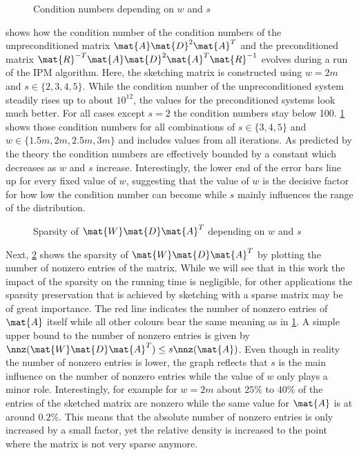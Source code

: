 \begin{figure}[tbp]%
  \centering%
  \caption{Condition numbers depending on \(w\) and \(s\)}%
  \label{fig:condition_number}
\end{figure}%

 shows how the condition number of the condition numbers of the unpreconditioned matrix \(\mat{A}\mat{D}^2\mat{A}^T\) and the preconditioned matrix \(\mat{R}^{-T}\mat{A}\mat{D}^2\mat{A}^T\mat{R}^{-1}\) evolves during a run of the IPM algorithm.
Here, the sketching matrix is constructed using \(w=2m\) and \(s \in \{2, 3, 4, 5\}\).
While the condition number of the unpreconditioned system steadily rises up to about \(10^{12}\), the values for the preconditioned systems look much better.
For all cases except \(s = 2\) the condition numbers stay below 100.
\cref{fig:condition_number} shows those condition numbers for all combinations of \(s \in \{3,4,5\}\) and \(w \in \{1.5m, 2m, 2.5m, 3m\}\) and includes values from all iterations.
As predicted by the theory the condition numbers are effectively bounded by a constant which decreases as \(w\) and \(s\) increase.
Interestingly, the lower end of the error bars line up for every fixed value of \(w\), suggesting that the value of \(w\) is the decisive factor for how low the condition number can become while \(s\) mainly influences the range of the distribution.

\begin{figure}[tbp]%
  \centering%
  \caption{Sparsity of \(\mat{W}\mat{D}\mat{A}^T\) depending on \(w\) and \(s\)}%
  \label{fig:sparsity}
\end{figure}%

Next, \cref{fig:sparsity} shows the sparsity of \(\mat{W}\mat{D}\mat{A}^T\) by plotting the number of nonzero entries of the matrix.
While we will see that in this work the impact of the sparsity on the running time is negligible, for other applications the sparsity preservation that is achieved by sketching with a sparse matrix may be of great importance.
The red line indicates the number of nonzero entries of \(\mat{A}\) itself while all other colours bear the same meaning as in \cref{fig:condition_number}.
A simple upper bound to the number of nonzero entries is given by \(\nnz(\mat{W}\mat{D}\mat{A}^T) \leq s \nnz(\mat{A})\).
Even though in reality the number of nonzero entries is lower, the graph reflects that \(s\) is the main influence on the number of nonzero entries while the value of \(w\) only plays a minor role.
Interestingly, for example for \(w = 2m\) about \(25\%\) to \(40\%\) of the entries of the sketched matrix are nonzero while the same value for \(\mat{A}\) is at around \(0.2\%\).
This means that the absolute number of nonzero entries is only increased by a small factor, yet the relative density is increased to the point where the matrix is not very sparse anymore.

